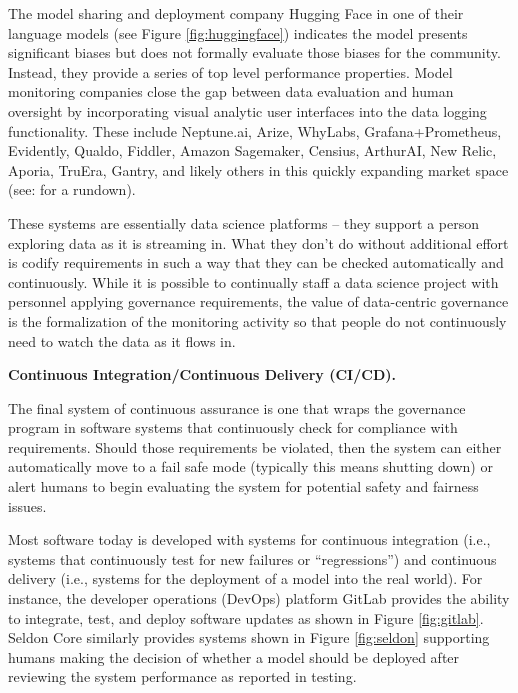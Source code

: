 The model sharing and deployment company Hugging Face in one of their language models (see Figure \ref{fig:huggingface}) indicates the model presents significant biases but does not formally evaluate those biases for the community. Instead, they provide a series of top level performance properties. Model monitoring companies close the gap between data evaluation and human oversight by incorporating visual analytic user interfaces into the data logging functionality. These include Neptune.ai, Arize, WhyLabs, Grafana+Prometheus, Evidently, Qualdo, Fiddler, Amazon Sagemaker, Censius, ArthurAI, New Relic, Aporia, TruEra, Gantry, and likely others in this quickly expanding market space (see: \cite{czakon_best_2021} for a rundown).

These systems are essentially data science platforms -- they support a person exploring data as it is streaming in. What they don't do without additional effort is codify requirements in such a way that they can be checked automatically and continuously. While it is possible to continually staff a data science project with personnel applying governance requirements, the value of data-centric governance is the formalization of the monitoring activity so that people do not continuously need to watch the data as it flows in.


\textbf{Continuous Integration/Continuous Delivery (CI/CD).}

The final system of continuous assurance is one that wraps the governance program in software systems that continuously check for compliance with requirements. Should those requirements be violated, then the system can either automatically move to a fail safe mode (typically this means shutting down) or alert humans to begin evaluating the system for potential safety and fairness issues.

Most software today is developed with systems for continuous integration (i.e., systems that continuously test for new failures or ``regressions'') and continuous delivery (i.e., systems for the deployment of a model into the real world). For instance, the developer operations (DevOps) platform GitLab provides the ability to integrate, test, and deploy software updates as shown in Figure \ref{fig:gitlab}. Seldon Core similarly provides systems shown in Figure \ref{fig:seldon} supporting humans making the decision of whether a model should be deployed after reviewing the system performance as reported in testing.

